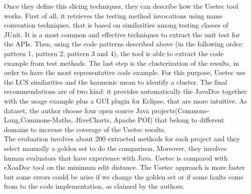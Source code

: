 Once they define this slicing techniques, they can describe how the Usetec tool works. First of all, it retrieves the testing method invocations using name convention techniques, that is based on similarities among testing classes of JUnit. It is a most common and effective techniques to extract the unit test for the APIs. Then, using the code patterns described above (in the following order: pattern 1, pattern 2, pattern 3 and 4), the tool is able to extract the code example from test methods. The last step is the clusterization of the results, in order to have the most representative code example. For this purpose, Usetec use the LCS similarities and the harmonic mean to identify a cluster. The final recommendations are of two kind: it provides automatically the JavaDoc together with the usage example plus a GUI plugin for Eclipse, that are more intuitive. As dataset, the author choose four open source Java projects(Commons-Lang,Commons-Maths, JfreeCharts, Apache POI) that belong to different domains to increase the coverage of the Usetec results. \\
The evaluation involves about 200 extracted methods for each project and they select manually a golden set to do the comparison. Moreover, they involves human evaluators that have experience with Java. Usetec is compared with eXoaDoc tool on the minimum edit distance. The Usetec approach is more faster but some errors could be arise if we change the golden set or if some faults come from to the code implementation, as claimed by the authors. 

